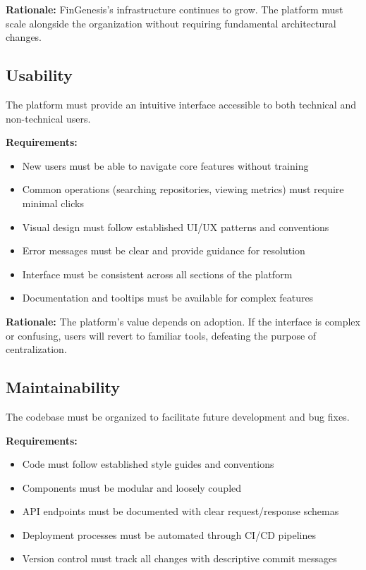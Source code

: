 \textbf{Rationale:} FinGenesis's infrastructure continues to grow. The platform must scale alongside the organization without requiring fundamental architectural changes.

\subsection{Usability}

The platform must provide an intuitive interface accessible to both technical and non-technical users.

\textbf{Requirements:}
\begin{itemize}
    \item New users must be able to navigate core features without training
    \item Common operations (searching repositories, viewing metrics) must require minimal clicks
    \item Visual design must follow established UI/UX patterns and conventions
    \item Error messages must be clear and provide guidance for resolution
    \item Interface must be consistent across all sections of the platform
    \item Documentation and tooltips must be available for complex features
\end{itemize}

\textbf{Rationale:} The platform's value depends on adoption. If the interface is complex or confusing, users will revert to familiar tools, defeating the purpose of centralization.

\subsection{Maintainability}

The codebase must be organized to facilitate future development and bug fixes.

\textbf{Requirements:}
\begin{itemize}
    \item Code must follow established style guides and conventions
    \item Components must be modular and loosely coupled
    \item API endpoints must be documented with clear request/response schemas
    \item Deployment processes must be automated through CI/CD pipelines
    \item Version control must track all changes with descriptive commit messages
\end{itemize}

